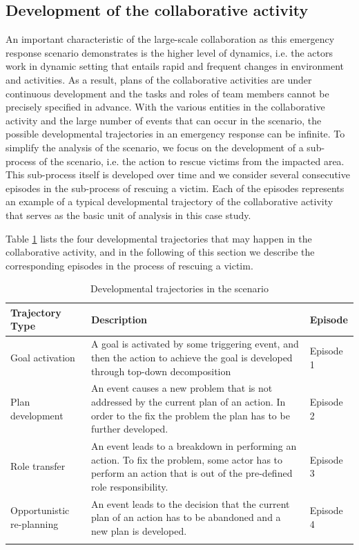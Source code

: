\subsection{Development of the collaborative activity} %
\label{sub:event_driven_activity_development}
An important characteristic of the large-scale collaboration as this emergency response scenario demonstrates is the higher level of dynamics, i.e. the actors work in dynamic setting that entails rapid and frequent changes in environment and activities. As a result, plans of the collaborative activities are under continuous development and the tasks and roles of team members cannot be precisely specified in advance. With the various entities in the collaborative activity and the large number of events that can occur in the scenario, the possible developmental trajectories in an emergency response can be infinite. To simplify the analysis of the scenario, we focus on the development of a sub-process of the scenario, i.e. the action to rescue victims from the impacted area. This sub-process itself is developed over time and we consider several consecutive episodes in the sub-process of rescuing a victim. Each of the episodes represents an example of a typical developmental trajectory of the collaborative activity that serves as the basic unit of analysis in this case study.

Table \ref{tab:development_trajectories} lists the four developmental trajectories that may happen in the collaborative activity, and in the following of this section we describe the corresponding episodes in the process of rescuing a victim. 

{\footnotesize
	\begin{longtable}{>{\raggedright}p{1.4in}>{\raggedright}p{2.5in}>{\raggedright}p{1in}}
\toprule 
\textbf{Trajectory Type} & \textbf{Description} & \textbf{Episode}\tabularnewline
\midrule 
Goal activation & A goal is activated by some triggering event, and then the action
to achieve the goal is developed through top-down decomposition & Episode 1\tabularnewline
\midrule 
Plan development & An event causes a new problem that is not addressed by the current
plan of an action. In order to the fix the problem the plan has to
be further developed. & Episode 2\tabularnewline
\midrule 
Role transfer & An event leads to a breakdown in performing an action. To fix the problem, some actor has to perform an action that is out of the pre-defined role responsibility. & Episode 3\tabularnewline
\midrule 
Opportunistic re-planning & An event leads to the decision that the current plan of an action
has to be abandoned and a new plan is developed. & Episode 4\tabularnewline
\bottomrule
\caption{Developmental trajectories in the scenario}
\label{tab:development_trajectories}
\end{longtable}
}

